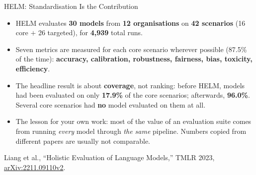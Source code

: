 \begin{frame}{HELM: Standardisation Is the Contribution}
  \begin{itemize}\footnotesize\itemsep0.45em
    \item[\textcolor{red}{$\blacktriangleright$}] HELM evaluates \textbf{30 models} from \textbf{12 organisations} on \textbf{42 scenarios} (16 core $+$ 26 targeted), for \textbf{4{,}939} total runs.
    \item[\textcolor{red}{$\blacktriangleright$}] Seven metrics are measured for each core scenario wherever possible (87.5\% of the time): \textbf{accuracy, calibration, robustness, fairness, bias, toxicity, efficiency}.
    \item[\textcolor{red}{$\blacktriangleright$}] The headline result is about \textbf{coverage}, not ranking: before HELM, models had been evaluated on only \textbf{17.9\%} of the core scenarios; afterwards, \textbf{96.0\%}. Several core scenarios had \textbf{no} model evaluated on them at all.
    \item[\textcolor{red}{$\blacktriangleright$}] The lesson for your own work: most of the value of an evaluation suite comes from running \textit{every} model through \textit{the same} pipeline. Numbers copied from different papers are usually not comparable.
  \end{itemize}
  \vspace{0.15em}
  {\scriptsize Liang et al., ``Holistic Evaluation of Language Models,'' TMLR 2023, \href{https://arxiv.org/abs/2211.09110v2}{arXiv:2211.09110v2}.}
\end{frame}

